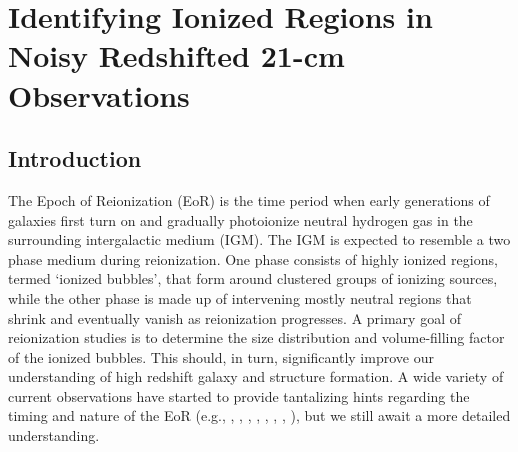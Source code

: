 

\ifpdf
    \graphicspath{{bubble_finding/figures/PNG/}{bubble_finding/figures/PDF/}{bubble_finding/figures/}}
\else
    \graphicspath{{bubble_finding/figures/EPS/}{example_chapter/figures/}}
\fi



\chapter{Identifying Ionized Regions in Noisy Redshifted 21-cm Observations}\label{sec:Bubble}

\section{Introduction} \label{sec:Bubbleintro}
 
The Epoch of Reionization (EoR) is the time period when early generations
of galaxies first turn on and gradually photoionize neutral hydrogen
gas in the surrounding intergalactic medium (IGM). The IGM
is expected to resemble a two phase medium during reionization.
One phase consists of highly ionized regions, termed `ionized bubbles', that form around clustered
groups of ionizing sources, while the other phase is made up of intervening mostly neutral regions that
shrink and eventually vanish as reionization progresses. A primary goal
of reionization studies is to determine the size distribution and volume-filling factor of
the ionized bubbles. This should, in turn, significantly improve our understanding of high
redshift galaxy and structure formation. 
A wide variety of current
observations have started to provide tantalizing hints regarding the timing and nature of the EoR (e.g., \citealt{Fan:2005es}, \citealt{Totani:2005ng}, 
\citealt{Dunkley:2008ie}, \citealt{Ouchi:2010}, \citealt{Bouwens:2011xu}, \citealt{Mortlock:2011va}, \citealt{Zahn:2011vp}, \citealt{Schenker:2011ea}),
but we still await a more detailed understanding. 

